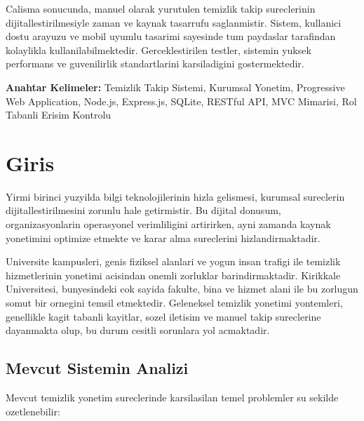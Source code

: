 Calisma sonucunda, manuel olarak yurutulen temizlik takip sureclerinin 
dijitallestirilmesiyle zaman ve kaynak tasarrufu saglanmistir. Sistem, 
kullanici dostu arayuzu ve mobil uyumlu tasarimi sayesinde tum paydaslar 
tarafindan kolaylikla kullanilabilmektedir. Gerceklestirilen testler, 
sistemin yuksek performans ve guvenilirlik standartlarini karsiladigini 
gostermektedir.

\textbf{Anahtar Kelimeler:} Temizlik Takip Sistemi, Kurumsal Yonetim, 
Progressive Web Application, Node.js, Express.js, SQLite, RESTful API, 
MVC Mimarisi, Rol Tabanli Erisim Kontrolu

\section{Giris}
\label{sec:giris}

Yirmi birinci yuzyilda bilgi teknolojilerinin hizla gelismesi, kurumsal 
sureclerin dijitallestirilmesini zorunlu hale getirmistir. Bu dijital 
donusum, organizasyonlarin operasyonel verimliligini artirirken, ayni 
zamanda kaynak yonetimini optimize etmekte ve karar alma sureclerini 
hizlandirmaktadir.

Universite kampusleri, genis fiziksel alanlari ve yogun insan trafigi ile 
temizlik hizmetlerinin yonetimi acisindan onemli zorluklar barindirmaktadir. 
Kirikkale Universitesi, bunyesindeki cok sayida fakulte, bina ve hizmet 
alani ile bu zorlugun somut bir ornegini temsil etmektedir. Geleneksel 
temizlik yonetimi yontemleri, genellikle kagit tabanli kayitlar, sozel 
iletisim ve manuel takip sureclerine dayanmakta olup, bu durum cesitli 
sorunlara yol acmaktadir.

\subsection{Mevcut Sistemin Analizi}
\label{subsec:mevcut-sistem}

Mevcut temizlik yonetim sureclerinde karsilasilan temel problemler su 
sekilde ozetlenebilir:


